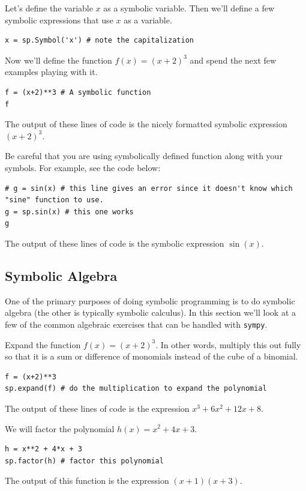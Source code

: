 Let's define the variable $x$ as a symbolic variable.  Then we'll define a few symbolic
expressions that use $x$ as a variable.

\bcode
\begin{lstlisting}
x = sp.Symbol('x') # note the capitalization
\end{lstlisting}

Now we'll define the function $f(x) = (x+2)^3$ and spend the next few examples playing
with it.

\bcode
\begin{lstlisting}
f = (x+2)**3 # A symbolic function
f
\end{lstlisting}
The output of these lines of code is the nicely formatted symbolic expression $\displaystyle
(x+2)^3$.

Be careful that you are using symbolically defined function along with your symbols.  For example, see the code below:

\bcode
\begin{lstlisting}
# g = sin(x) # this line gives an error since it doesn't know which "sine" function to use.
g = sp.sin(x) # this one works
g
\end{lstlisting}
The output of these lines of code is the symbolic expression $\sin(x)$.

\subsection{Symbolic Algebra}
One of the primary purposes of doing symbolic programming is to do symbolic algebra (the
other is typically symbolic calculus).  In this section we'll look at a few of the common
algebraic exercises that can be handled with \texttt{sympy}.

\begin{example}
    Expand the function $f(x) = (x+2)^3$.  In other words, multiply this out fully so that
    it is a sum or difference of monomials instead of the cube of a binomial.

\bcode
\begin{lstlisting}
f = (x+2)**3
sp.expand(f) # do the multiplication to expand the polynomial
\end{lstlisting}
The output of these lines of code is the expression $x^{3} + 6 x^{2} + 12 x + 8$.
\end{example}

\begin{example}
    We will factor the polynomial $h(x) = x^2 + 4x + 3$.

\bcode
\begin{lstlisting}
h = x**2 + 4*x + 3
sp.factor(h) # factor this polynomial
\end{lstlisting}
The output of this function is the expression $\left(x + 1\right) \left(x + 3\right)$.
\end{example}

